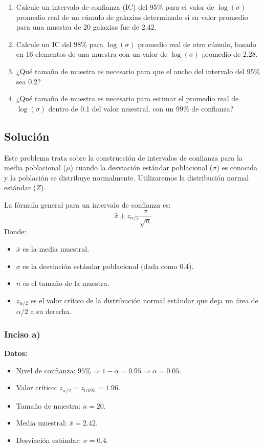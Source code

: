 \documentclass[12pt]{article}
\begin{document}
\begin{enumerate}
    \item[a)] Calcule un intervalo de confianza (IC) del 95\% para el valor de $\log(\sigma)$ promedio real de un cúmulo de galaxias determinado si su valor promedio para una muestra de 20 galaxias fue de 2.42.
    \item[b)] Calcule un IC del 98\% para $\log(\sigma)$ promedio real de otro cúmulo, basado en 16 elementos de una muestra con un valor de $\log(\sigma)$ promedio de 2.28.
    \item[c)] ¿Qué tamaño de muestra es necesario para que el ancho del intervalo del 95\% sea 0.2?
    \item[d)] ¿Qué tamaño de muestra es necesario para estimar el promedio real de $\log(\sigma)$ dentro de 0.1 del valor muestral, con un 99\% de confianza?
\end{enumerate}

\subsection{Solución}

Este problema trata sobre la construcción de intervalos de confianza para la media poblacional ($\mu$) cuando la desviación estándar poblacional ($\sigma$) es conocida y la población se distribuye normalmente. Utilizaremos la distribución normal estándar ($Z$).

La fórmula general para un intervalo de confianza es:
$$ \bar{x} \pm z_{\alpha/2} \frac{\sigma}{\sqrt{n}} $$
Donde:
\begin{itemize}
    \item $\bar{x}$ es la media muestral.
    \item $\sigma$ es la desviación estándar poblacional (dada como 0.4).
    \item $n$ es el tamaño de la muestra.
    \item $z_{\alpha/2}$ es el valor crítico de la distribución normal estándar que deja un área de $\alpha/2$ a su derecha.
\end{itemize}

\subsubsection{Inciso a)}
\textbf{Datos:}
\begin{itemize}
    \item Nivel de confianza: $95\% \Rightarrow 1 - \alpha = 0.95 \Rightarrow \alpha = 0.05$.
    \item Valor crítico: $z_{\alpha/2} = z_{0.025} = 1.96$.
    \item Tamaño de muestra: $n = 20$.
    \item Media muestral: $\bar{x} = 2.42$.
    \item Desviación estándar: $\sigma = 0.4$.
\end{itemize}
\end{document}
